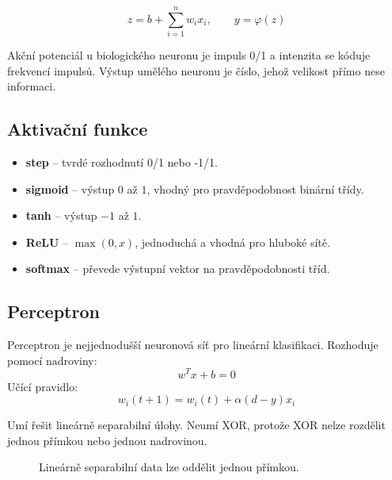\begin{equation}
    z=b+\sum_{i=1}^{n}w_i x_i,\qquad y=\varphi(z)
\end{equation}

Akční potenciál u biologického neuronu je impuls 0/1 a intenzita se kóduje
frekvencí impulsů. Výstup umělého neuronu je číslo, jehož velikost přímo nese
informaci.

\subsection*{Aktivační funkce}
\begin{itemize}
    \item \textbf{step} -- tvrdé rozhodnutí 0/1 nebo -1/1.
    \item \textbf{sigmoid} -- výstup \(0\) až \(1\), vhodný pro pravděpodobnost binární třídy.
    \item \textbf{tanh} -- výstup \(-1\) až \(1\).
    \item \textbf{ReLU} -- \(\max(0,x)\), jednoduchá a vhodná pro hluboké sítě.
    \item \textbf{softmax} -- převede výstupní vektor na pravděpodobnosti tříd.
\end{itemize}

\subsection*{Perceptron}
Perceptron je nejjednodušší neuronová síť pro lineární klasifikaci. Rozhoduje
pomocí nadroviny:
\begin{equation}
    w^T x + b = 0
\end{equation}
Učící pravidlo:
\begin{equation}
    w_i(t+1)=w_i(t)+\alpha(d-y)x_i
\end{equation}

Umí řešit lineárně separabilní úlohy. Neumí XOR, protože XOR nelze rozdělit
jednou přímkou nebo jednou nadrovinou.

\begin{figure}[H]
    \centering
    \caption{Lineárně separabilní data lze oddělit jednou přímkou.}
\end{figure}

